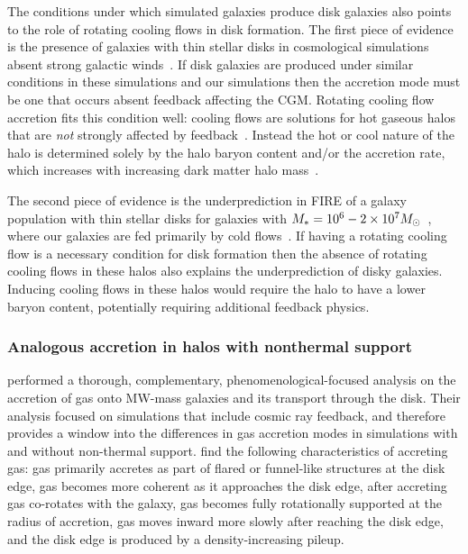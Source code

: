 \documentclass[fleqn,usenatbib]{mnras}
\begin{document}
The conditions under which simulated galaxies produce disk galaxies also points to the role of rotating cooling flows in disk formation.
The first piece of evidence is the presence of galaxies with thin stellar disks in cosmological simulations absent strong galactic winds~\citep{Guedes2011, Bird2013}.
If disk galaxies are produced under similar conditions in these simulations and our simulations then the accretion mode must be one that occurs absent feedback affecting the CGM.
Rotating cooling flow accretion fits this condition well:
cooling flows are solutions for hot gaseous halos that are \textit{not} strongly affected by feedback~\citep{Stern2019}.
Instead the hot or cool nature of the halo is determined solely by the halo baryon content and/or the accretion rate, which increases with increasing dark matter halo mass~\citep{Stern2020a}.

The second piece of evidence is the underprediction in FIRE of a galaxy population with thin stellar disks for galaxies with $M_* = 10^6 \-- 2 \times 10^7 M_\odot$~\citep{El-Badry2018a}, where our galaxies are fed primarily by cold flows~\citep{Stern2020}.
If having a rotating cooling flow is a necessary condition for disk formation then the absence of rotating cooling flows in these halos also explains the underprediction of disky galaxies.
Inducing cooling flows in these halos would require the halo to have a lower baryon content, potentially requiring additional feedback physics.

\subsubsection{Analogous accretion in halos with nonthermal support}

\cite{Trapp2021} performed a thorough, complementary, phenomenological-focused analysis on the accretion of gas onto MW-mass galaxies and its transport through the disk.
Their analysis focused on simulations that include cosmic ray feedback, and therefore provides a window into the differences in gas accretion modes in simulations with and without non-thermal support.
\citeauthor{Trapp2021} find the following characteristics of accreting gas:
gas primarily accretes as part of flared or funnel-like structures at the disk edge,
gas becomes more coherent as it approaches the disk edge,
after accreting gas co-rotates with the galaxy,
gas becomes fully rotationally supported at the radius of accretion,
gas moves inward more slowly after reaching the disk edge,
and the disk edge is produced by a density-increasing pileup.
\end{document}
